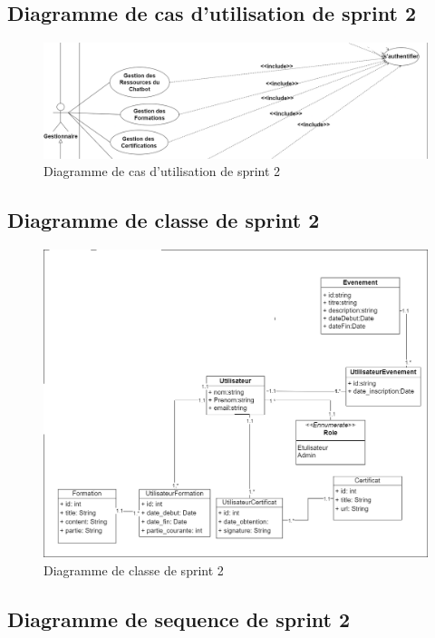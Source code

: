 \documentclass[a4paper, 11pt, openany]{report}
\begin{document}
\subsection{Diagramme de cas d'utilisation de sprint 2}


\begin{figure}[H]
\centering
\includegraphics[width=\textwidth]{sprint2-usecase.png} 
\caption{Diagramme de cas d'utilisation de sprint 2}
\label{fig:s2_usecase}
\end{figure}

\subsection{Diagramme de classe de sprint 2}
\begin{figure}[H]
\centering
\includegraphics[width=\textwidth]{sprint2-class.png} 
\caption{Diagramme de classe de sprint 2}
\label{fig:s2_class}
\end{figure}

\subsection{Diagramme de sequence de sprint 2}
\end{document}

